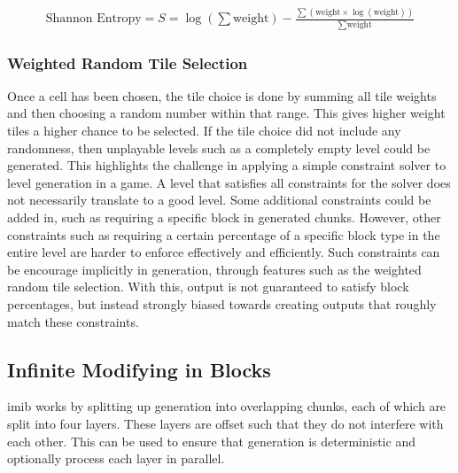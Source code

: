 \begin{align}
    \label{shannonEntropy}
    \text{Shannon Entropy}=S=\log(\sum{\text{weight}}) - \frac{\sum\left(\text{weight} \times \log(\text{weight})\right)}{\sum{\text{weight}}}
\end{align}


\subsubsection{Weighted Random Tile Selection}
Once a cell has been chosen, the tile choice is done by summing all tile weights and then choosing a random number within that range. This gives higher weight tiles a higher chance to be selected. If the tile choice did not include any randomness, then unplayable levels such as a completely empty level could be generated. This highlights the challenge in applying a simple constraint solver to level generation in a game. A level that satisfies all constraints for the solver does not necessarily translate to a good level. Some additional constraints could be added in, such as requiring a specific block in generated chunks. However, other constraints such as requiring a certain percentage of a specific block type in the entire level are harder to enforce effectively and efficiently. Such constraints can be encourage implicitly in generation, through features such as the weighted random tile selection. With this, output is not guaranteed to satisfy block percentages, but instead strongly biased towards creating outputs that roughly match these constraints.%


\subsection{Infinite Modifying in Blocks}
\label{sec:IMIB}
\acrlong{imib} works by splitting up generation into overlapping chunks, each of which are split into four layers. These layers are offset such that they do not interfere with each other. This can be used to ensure that generation is deterministic and optionally process each layer in parallel.%


